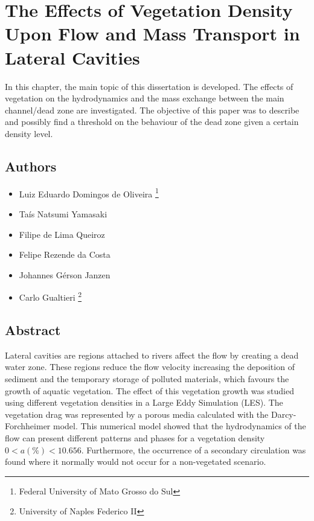 \chapter{The Effects of Vegetation Density Upon Flow and Mass Transport in Lateral Cavities}
\label{chap:art4}
In this chapter, the main topic of this dissertation is developed. The effects of vegetation on the hydrodynamics and the mass exchange between the main channel/dead zone are investigated. The objective of this paper was to describe and possibly find a threshold on the behaviour of the dead zone given a certain density level.

\section*{Authors}
\begin{itemize}
    \item Luiz Eduardo Domingos de Oliveira \footnote{Federal University of Mato Grosso do Sul}
    \item Taís Natsumi Yamasaki \footnotemark[1]
    \item Filipe de Lima Queiroz \footnotemark[1]
    \item Felipe Rezende da Costa \footnotemark[1]
    \item Johannes Gérson Janzen \footnotemark[1]
    \item Carlo Gualtieri \footnote{University of Naples Federico II}
\end{itemize}

\section*{Abstract}
Lateral cavities are regions attached to rivers affect the flow by creating a dead water zone. These regions reduce the flow velocity increasing the deposition of sediment and the temporary storage of polluted materials, which favours the growth of aquatic vegetation. The effect of this vegetation growth was studied using different vegetation densities in a Large Eddy Simulation (LES). The vegetation drag was represented by a porous media calculated with the Darcy-Forchheimer model. This numerical model showed that the hydrodynamics of the flow can present different patterns and phases for a vegetation density $0<a(\%)<10.656$. Furthermore, the occurrence of a secondary circulation was found where it normally would not occur for a non-vegetated scenario.

